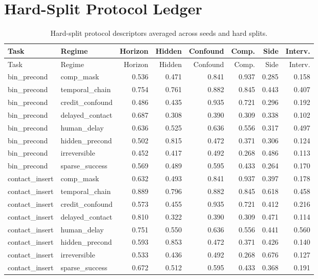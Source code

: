 \documentclass{article}
\begin{document}
\section{Hard-Split Protocol Ledger}
\begin{longtable}{@{}llrrrrrr@{}}
\caption{Hard-split protocol descriptors averaged across seeds and hard splits.}\\
\toprule
Task & Regime & Horizon & Hidden & Confound & Comp. & Side & Interv.\\
\midrule
\endfirsthead
\toprule
Task & Regime & Horizon & Hidden & Confound & Comp. & Side & Interv.\\
\midrule
\endhead
bin\_precond & comp\_mask & 0.536 & 0.471 & 0.841 & 0.937 & 0.285 & 0.158 \\
bin\_precond & temporal\_chain & 0.754 & 0.761 & 0.882 & 0.845 & 0.443 & 0.407 \\
bin\_precond & credit\_confound & 0.486 & 0.435 & 0.935 & 0.721 & 0.296 & 0.192 \\
bin\_precond & delayed\_contact & 0.687 & 0.308 & 0.390 & 0.309 & 0.338 & 0.102 \\
bin\_precond & human\_delay & 0.636 & 0.525 & 0.636 & 0.556 & 0.317 & 0.497 \\
bin\_precond & hidden\_precond & 0.502 & 0.815 & 0.472 & 0.371 & 0.306 & 0.124 \\
bin\_precond & irreversible & 0.452 & 0.417 & 0.492 & 0.268 & 0.486 & 0.113 \\
bin\_precond & sparse\_success & 0.569 & 0.489 & 0.595 & 0.433 & 0.264 & 0.170 \\
contact\_insert & comp\_mask & 0.632 & 0.493 & 0.841 & 0.937 & 0.397 & 0.178 \\
contact\_insert & temporal\_chain & 0.889 & 0.796 & 0.882 & 0.845 & 0.618 & 0.458 \\
contact\_insert & credit\_confound & 0.573 & 0.455 & 0.935 & 0.721 & 0.412 & 0.216 \\
contact\_insert & delayed\_contact & 0.810 & 0.322 & 0.390 & 0.309 & 0.471 & 0.114 \\
contact\_insert & human\_delay & 0.751 & 0.550 & 0.636 & 0.556 & 0.441 & 0.560 \\
contact\_insert & hidden\_precond & 0.593 & 0.853 & 0.472 & 0.371 & 0.426 & 0.140 \\
contact\_insert & irreversible & 0.533 & 0.436 & 0.492 & 0.268 & 0.676 & 0.127 \\
contact\_insert & sparse\_success & 0.672 & 0.512 & 0.595 & 0.433 & 0.368 & 0.191 \\

\end{longtable}
\end{document}
